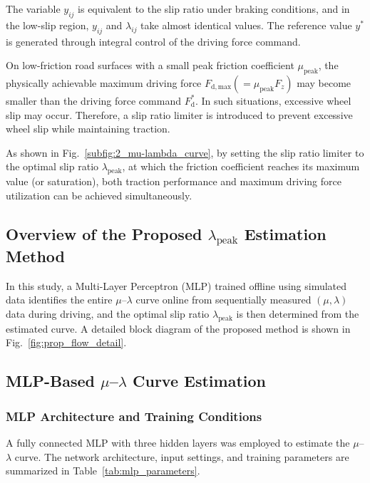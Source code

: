 \documentclass[dvipdfmx,conference]{IEEEtran}
\begin{document}
The variable $y_{ij}$ is equivalent to the slip ratio under braking conditions, and in the low-slip region, $y_{ij}$ and $\lambda_{ij}$ take almost identical values. The reference value $y^{*}$ is generated through integral control of the driving force command.

On low-friction road surfaces with a small peak friction coefficient $\mu_{\mathrm{peak}}$, the physically achievable maximum driving force $F_{\mathrm{d,max}}(=\mu_{\mathrm{peak}}F_{z})$ may become smaller than the driving force command $F_{\mathrm{d}}^{*}$. In such situations, excessive wheel slip may occur. Therefore, a slip ratio limiter is introduced to prevent excessive wheel slip while maintaining traction.

As shown in Fig.~\ref{subfig:2_mu-lambda_curve}, by setting the slip ratio limiter to the optimal slip ratio $\lambda_{\mathrm{peak}}$, at which the friction coefficient reaches its maximum value (or saturation), both traction performance and maximum driving force utilization can be achieved simultaneously.

\subsection{Overview of the Proposed $\lambda_{\mathrm{peak}}$ Estimation Method}
In this study, a Multi-Layer Perceptron (MLP) trained offline using simulated data identifies the entire $\mu$--$\lambda$ curve online from sequentially measured $(\mu,\lambda)$ data during driving, and the optimal slip ratio $\lambda_{\mathrm{peak}}$ is then determined from the estimated curve. A detailed block diagram of the proposed method is shown in Fig.~\ref{fig:prop_flow_detail}.

\subsection{MLP-Based $\mu$--$\lambda$ Curve Estimation}
\subsubsection{MLP Architecture and Training Conditions}

A fully connected MLP with three hidden layers was employed to estimate the $\mu$--$\lambda$ curve.
The network architecture, input settings, and training parameters are summarized in Table~\ref{tab:mlp_parameters}.
\end{document}
